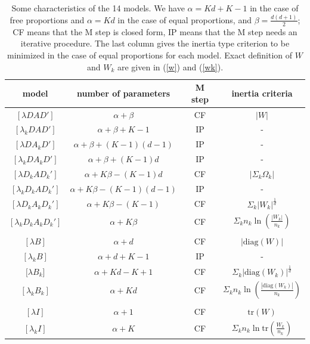 \documentclass[12pt]{article}
\begin{document}
\begin{table}[hbtp]
  \centering
  \begin{tabular}{|c|c|c|c|}
    \hline
    model & number of parameters & M step& inertia criteria \\
    \hline
    $[\lambda DAD']$&$\alpha+\beta$ &CF&$|W|$ \\
    $[\lambda_k D A D']$&$\alpha+\beta+K-1$&IP&- \\
    $[\lambda D A_k D']$&$\alpha+\beta+(K-1)(d-1)$&IP&- \\
    $[\lambda_k D A_k D']$&$\alpha+\beta+(K-1)d$&IP&- \\
    $[\lambda D_k A D_k']$&$\alpha+K\beta-(K-1)d$&CF&$|\Sigma_k \Omega_k|$ \\
    $[\lambda_k D_k A D_k']$&$\alpha+K\beta-(K-1)(d-1)$&IP&- \\
    $[\lambda D_k A_k D_k']$&$\alpha+K\beta-(K-1)$&CF&$\Sigma_k |W_k|^{\frac{1}{d}}$ \\
    $[\lambda_k D_k A_k D_k']$&$\alpha+K\beta $&CF& $\Sigma_k n_k \ln (\frac{|W_k|}{n_k})$ \\
    &&&\\
    $[\lambda B]$&$\alpha+d$&CF&$|\mbox{diag}(W)|$ \\
    $[\lambda_k B]$  & $\alpha+d+K-1$ &IP&-  \\
    $[\lambda B_k$] &$\alpha+Kd-K+1$ &CF&$\Sigma_k |\mbox{diag}(W_k)|^{\frac{1}{d}}$  \\
    $[\lambda_k B_k]$&$\alpha+Kd$&CF&$\Sigma_k n_k \ln (\frac{|\mbox{diag}(W_k)|}{n_k})$ \\
    &&&\\
    $[\lambda I]$&$\alpha+1$&CF&$\mbox{tr}(W)$ \\
    $[\lambda_k I]$&$\alpha+K$&CF&$\Sigma_k n_k \ln \mbox{tr} (\frac{W_k}{n_k})$ \\
    \hline
  \end{tabular}
  \caption{Some characteristics of the 14 models. We have
    $\alpha=Kd+K-1$ in the case of free proportions and $\alpha=Kd$ in
    the case of equal proportions, and $\beta=\frac{d(d+1)}{2}$; CF
    means that the M step is closed form, IP means that the M step
    needs an iterative procedure.  The last column gives the inertia
    type criterion to be minimized in the case of equal proportions
    for each model. Exact definition of $W$ and $W_k$ are given in (\ref{w}) and (\ref{wk}).}
  \label{tab:model}
\end{table}
\end{document}

